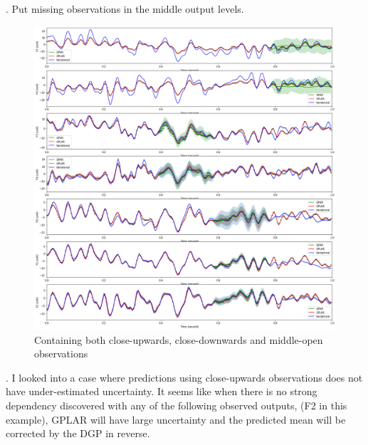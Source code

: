 \documentclass{article}
\begin{document}
. Put missing observations in the middle output levels.

\begin{figure}[H]
\centering
\includegraphics[width=.8\linewidth]{eeg-bidirectional-4.png}
\caption{Containing both close-upwards, close-downwards and middle-open observations}
\end{figure}

. I looked into a case where predictions using close-upwards observations does not have under-estimated uncertainty. It seems like when there is no strong dependency discovered with any of the following observed outputs, (F2 in this example), GPLAR will have large uncertainty and the predicted mean will be corrected by the DGP in reverse.\\
\end{document}
